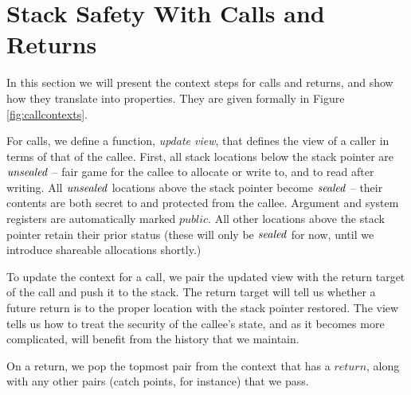 \documentclass[10pt,conference]{ieeetran}%
\theoremstyle{definition}
\begin{document}

\section{Stack Safety With Calls and Returns}

In this section we will present the context steps for calls and returns,
and show how they translate into properties. They are given formally in
Figure \ref{fig:callcontexts}.

For calls, we define a function, {\it update view}, that defines the view
of a caller in terms of that of the callee.
First, all stack locations below the stack pointer
are \(\mathit{unsealed}\) -- fair game for the callee to allocate or write to, and
to read after writing. All \(\mathit{unsealed}\) locations above the stack pointer
become \(\mathit{sealed}\) -- their contents are both secret to and protected
from the callee. Argument and system registers are automatically marked
\(\mathit{public}\). All other locations above the stack pointer
retain their prior status (these will only be \(\mathit{sealed}\) for now,
until we introduce shareable allocations shortly.)

To update the context for a call, we pair the updated view with the return target of the
call and push it to the stack. The return target will tell us whether a future
return is to the proper location with the stack pointer restored.
The view tells us how to treat the security of the callee's state, and as
it becomes more complicated, will benefit from the history that we maintain.

On a return, we pop the topmost pair from the context that has
a \(\mathit{return}\), along with any other pairs (catch points,
for instance) that we pass.
\end{document}
